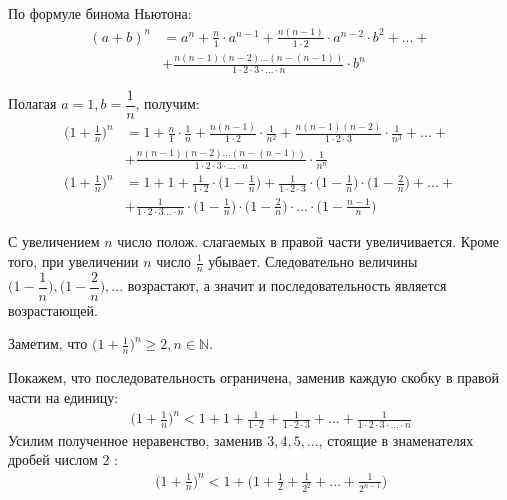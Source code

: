 \documentclass[12pt, fleqn]{extarticle}
\begin{document}
По формуле бинома Ньютона:
\begin{align*}
    (a + b)^n & = a^n + \frac{n}{1} \cdot a^{n - 1} + \frac{n(n - 1)}{1 \cdot 2} \cdot a^{n - 2} \cdot b^2 + ... + \\
              & + \frac{n(n - 1)(n - 2)...(n - (n - 1))}{1 \cdot 2 \cdot 3 \cdot ... \cdot n} \cdot b^n
\end{align*}

Полагая \(a = 1, b = \dfrac{1}{n}\), получим:
\begin{align*}
    \Big(1 + \frac{1}{n}\Big)^n & = 1 + \frac{n}{1} \cdot \frac{1}{n} + \frac{n(n - 1)}{1 \cdot 2} \cdot \frac{1}{n^2} +
    \frac{n(n - 1)(n - 2)}{1 \cdot 2 \cdot 3} \cdot \frac{1}{n^3} + ... +                                                                                                                             \\
                                & +                            \frac{n(n - 1)(n - 2)...(n - (n - 1))}{1 \cdot 2 \cdot 3 \cdot ... \cdot n} \cdot \frac{1}{n^n}                                        \\
    \Big(1 + \frac{1}{n}\Big)^n & = 1 + 1 + \frac{1}{1 \cdot 2} \cdot \Big(1 - \frac{1}{n}\Big) + \frac{1}{1 \cdot 2 \cdot 3} \cdot \Big(1 - \frac{1}{n}\Big) \cdot \Big(1 - \frac{2}{n}\Big) + ... + \\
                                & + \frac{1}{1 \cdot 2 \cdot 3 ... \cdot n} \cdot \Big(1 - \frac{1}{n}\Big) \cdot \Big(1 - \frac{2}{n}\Big) \cdot ... \cdot \Big(1 - \frac{n - 1}{n}\Big)
\end{align*}

С увеличением \(n\) число полож. слагаемых в правой части увеличивается. Кроме того, при увеличении \(n\) число  \(\frac{1}{n}\) убывает. Следовательно величины \(\Big(1 - \dfrac{1}{n}\Big), \Big(1 - \dfrac{2}{n}\Big), ...\) возрастают, а значит и последовательность является возрастающей.

Заметим, что \(\Big(1 + \frac{1}{n}\Big)^n \geq 2, n \in \mathbb{N}\).

Покажем, что последовательность ограничена, заменив каждую скобку в правой части на единицу:
\begin{align*}
     &  &
    \Big(1 + \frac{1}{n}\Big)^n < 1 + 1 + \frac{1}{1 \cdot 2} + \frac{1}{1 \cdot 2 \cdot 3} + ... + \frac{1}{1 \cdot 2 \cdot 3 \cdot ... \cdot n}
\end{align*}
Усилим полученное неравенство, заменив \(3, 4, 5, ...\), стоящие в знаменателях дробей числом  \(2\) :
\begin{align*}
     &  &
    \Big(1 + \frac{1}{n}\Big)^n < 1 + \Big(1 + \frac{1}{2} + \frac{1}{2^2} + ... + \frac{1}{2^{n - 1}}\Big)
\end{align*}
\end{document}
